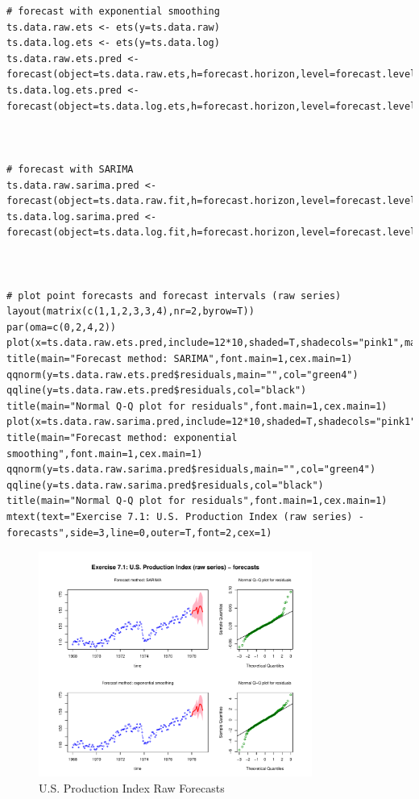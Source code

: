 \begin{lstlisting}
# forecast with exponential smoothing
ts.data.raw.ets <- ets(y=ts.data.raw)
ts.data.log.ets <- ets(y=ts.data.log)
ts.data.raw.ets.pred <- forecast(object=ts.data.raw.ets,h=forecast.horizon,level=forecast.level)
ts.data.log.ets.pred <- forecast(object=ts.data.log.ets,h=forecast.horizon,level=forecast.level)



# forecast with SARIMA
ts.data.raw.sarima.pred <- forecast(object=ts.data.raw.fit,h=forecast.horizon,level=forecast.level)
ts.data.log.sarima.pred <- forecast(object=ts.data.log.fit,h=forecast.horizon,level=forecast.level)



# plot point forecasts and forecast intervals (raw series)
layout(matrix(c(1,1,2,3,3,4),nr=2,byrow=T))
par(oma=c(0,2,4,2))
plot(x=ts.data.raw.ets.pred,include=12*10,shaded=T,shadecols="pink1",main="",col="blue",fcol="red",type="b",xlab="time")
title(main="Forecast method: SARIMA",font.main=1,cex.main=1)
qqnorm(y=ts.data.raw.ets.pred$residuals,main="",col="green4")
qqline(y=ts.data.raw.ets.pred$residuals,col="black")
title(main="Normal Q-Q plot for residuals",font.main=1,cex.main=1)
plot(x=ts.data.raw.sarima.pred,include=12*10,shaded=T,shadecols="pink1",main="",col="blue",fcol="red",type="b",xlab="time")
title(main="Forecast method: exponential smoothing",font.main=1,cex.main=1)
qqnorm(y=ts.data.raw.sarima.pred$residuals,main="",col="green4")
qqline(y=ts.data.raw.sarima.pred$residuals,col="black")
title(main="Normal Q-Q plot for residuals",font.main=1,cex.main=1)
mtext(text="Exercise 7.1: U.S. Production Index (raw series) - forecasts",side=3,line=0,outer=T,font=2,cex=1)
\end{lstlisting}

\begin{figure}[H]
\centering
\includegraphics[width=0.8\textwidth]{plots/UsProdRawForecast.pdf}
\caption{U.S. Production Index Raw Forecasts}
\end{figure}

